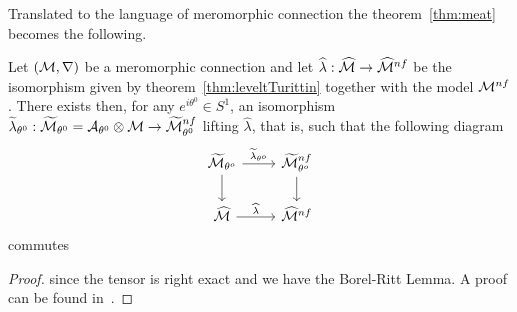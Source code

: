 \begin{comment}
  \begin{rem}
    We are then able to find a \rewrite{(cyclic)} covering of the $S^1$ of
    arcs such that on every arc there exists a lift $\tilde F$ of $\hat F$.
  \end{rem}
\end{comment}
\TODO{}

Translated to the language of meromorphic connection the theorem~\ref{thm:meat}
becomes the following.
\begin{thm}
  Let $(\mathcal{M},\nabla)$ be a meromorphic connection and let
  $\widehat\lambda:\widehat{\mathcal{M}}\to\widehat{\mathcal{M}}^{nf}$ be the isomorphism given by
  theorem~\ref{thm:leveltTurittin} together with the model $\mathcal{M}^{nf}$.
  There exists then, for any $e^{i\theta^0}\in S^1$, an isomorphism
  $\widetilde\lambda_{\theta^0}:
  \widetilde{\mathcal{M}}_{\theta^0}=\mathcal{A}_{\theta^0}\otimes\mathcal{M}\to\widetilde{\mathcal{M}}_{\theta^0}^{nf}$
  lifting $\hat\lambda$, that is, such that the following diagram
  \[ \begin{tikzcd}
      \tilde\cM_{\theta^o} \dar \rar{\tilde\lambda_{\theta^o}} &
      \tilde\cM^{nf}_{\theta^o} \dar
      \\\hat\cM \rar{\hat\lambda} &
      \hat\cM^{nf}
  \end{tikzcd} \]
  commutes
\end{thm}
\begin{proof}
   since the tensor is right exact and we have the
  Borel-Ritt Lemma.
  A proof can be found in~\cite[Sec.II.2.4]{sabbah_cimpa90}.
\end{proof}

\begin{comment}
  \begin{multicols}{2}
    \begin{thm}
      \marginnote{\cite[Thm.II.2.3.1]{sabbah_cimpa90}}
      \rewrite{Let $\cM_{K}$ be a meromorphic connection. There exists an
        integer $q\geq 1$ such that, after the ramification $x=t^q$, one has,
        for all $\theta\in S^1$ and each sufficiently small interval $V$
        centered at $\theta$}
      \[
        \cA_L(V)\otimes_L\cM_L\cong\cA_L(V)\otimes_L
        \left(\cF_L^R\otimes\cG_L\right)
      \]
    \end{thm}
    \begin{proof}
      See \cite[Sec.II.2.4]{sabbah_cimpa90}
    \end{proof}
  \columnbreak
  \end{multicols}
\end{comment}

